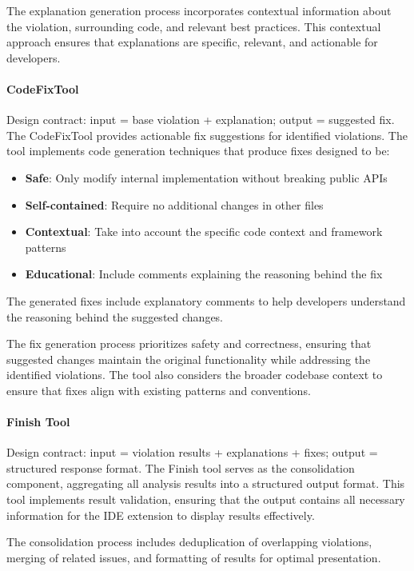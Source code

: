 \begin{spacing}{1.2}
The explanation generation process incorporates contextual information about the violation, surrounding code, and relevant best practices. This contextual approach ensures that explanations are specific, relevant, and actionable for developers.

\paragraph{CodeFixTool}
Design contract: input = base violation + explanation; output = suggested fix.
The CodeFixTool provides actionable fix suggestions for identified violations. The tool implements code generation techniques that produce fixes designed to be:
\begin{itemize}
    \item \textbf{Safe}: Only modify internal implementation without breaking public APIs
    \item \textbf{Self-contained}: Require no additional changes in other files
    \item \textbf{Contextual}: Take into account the specific code context and framework patterns
    \item \textbf{Educational}: Include comments explaining the reasoning behind the fix
\end{itemize}
The generated fixes include explanatory comments to help developers understand the reasoning behind the suggested changes.

The fix generation process prioritizes safety and correctness, ensuring that suggested changes maintain the original functionality while addressing the identified violations. The tool also considers the broader codebase context to ensure that fixes align with existing patterns and conventions.

\paragraph{Finish Tool}
Design contract: input = violation results + explanations + fixes; output = structured response format.
The Finish tool serves as the consolidation component, aggregating all analysis results into a structured output format. This tool implements result validation, ensuring that the output contains all necessary information for the IDE extension to display results effectively.

The consolidation process includes deduplication of overlapping violations, merging of related issues, and formatting of results for optimal presentation.



\end{spacing}

